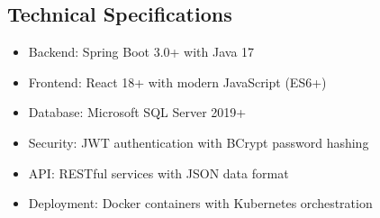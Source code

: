 \documentclass[12pt,a4paper]{article}
\begin{document}
\subsection{Technical Specifications}

\begin{itemize}
\item Backend: Spring Boot 3.0+ with Java 17
\item Frontend: React 18+ with modern JavaScript (ES6+)
\item Database: Microsoft SQL Server 2019+
\item Security: JWT authentication with BCrypt password hashing
\item API: RESTful services with JSON data format
\item Deployment: Docker containers with Kubernetes orchestration
\end{itemize}
\end{document}
